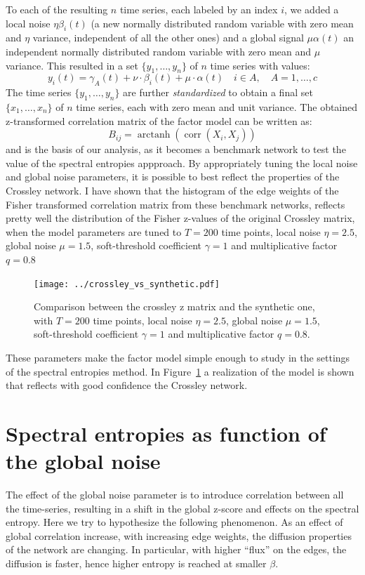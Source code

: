 \documentclass[a4paper]{article}
\DeclareMathOperator\arctanh{arctanh}
\DeclareMathOperator\corr{corr}
\begin{document}
To each of the resulting $n$ time series, each labeled by an index $i$, we added a local noise $\eta \beta_i(t)$ (a new normally distributed random variable with zero mean and $\eta$ variance, independent of all the other ones) and a global signal $\mu \alpha(t)$ an independent normally distributed random variable with zero mean and $\mu$ variance.
This resulted in a set $\{y_1,\dots,y_n\}$ of $n$ time series with values:
\begin{equation}
y_i(t)= \gamma_A(t) + \nu\cdot \beta_i(t) + \mu\cdot \alpha(t) \quad i\in A, \quad A=1,\ldots,c
\label{eq:bench}
\end{equation}
The time series $\{y_1,\dots,y_n\}$ are further \emph{standardized} to obtain a final set $\{x_1,\dots,x_n\}$ of $n$ time series, each with zero mean and unit variance.
The obtained z-transformed correlation matrix of the factor model can be written as:
\begin{equation}
B_{ij} = \arctanh\left( \corr(X_i, X_j) \right)
\end{equation}
and is the basis of our analysis, as it becomes a benchmark network to test the value of the spectral entropies appproach.
By appropriately tuning the local noise and global noise parameters, it is possible to best reflect the properties of the Crossley network.
I have shown that the histogram of the edge weights of the Fisher transformed correlation matrix from these benchmark networks, reflects pretty well the distribution of the Fisher z-values of the original Crossley matrix, when the model parameters are tuned to $T=200$ time points, local noise $\eta=2.5$, global noise $\mu=1.5$, soft-threshold coefficient $\gamma=1$ and multiplicative factor $q=0.8$
\begin{figure}
\texttt{[image: ../crossley\_vs\_synthetic.pdf]}
\caption{Comparison between the crossley z matrix and the synthetic one, with $T=200$ time points, local noise $\eta=2.5$, global noise $\mu=1.5$, soft-threshold coefficient $\gamma=1$ and multiplicative factor $q=0.8$.}
\label{fig:benchmark_network}
\end{figure}

These parameters make the factor model simple enough to study in the settings of the spectral entropies method. In Figure~\ref{fig:benchmark_network} a realization of the model is shown that reflects with good confidence the Crossley network.

\section{Spectral entropies as function of the global noise}
The effect of the global noise parameter is to introduce correlation between all the time-series, resulting in a shift in the global z-score and effects on the spectral entropy. 
Here we try to hypothesize the following phenomenon. As an effect of global correlation increase, with increasing edge weights, the diffusion properties of the network are changing. In particular, with higher ``flux'' on the edges, the diffusion is faster, hence higher entropy is reached at smaller $\beta$.
\end{document}
